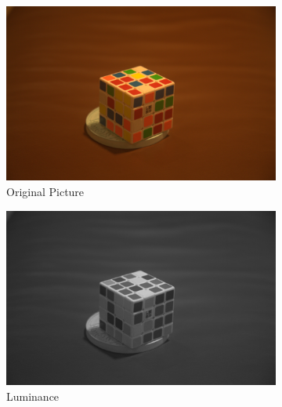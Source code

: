 \documentclass{article}
\begin{document}
\begin{figure}[h!]
\centering
\begin{subfigure}[b]{0.4\textwidth}
\caption{Original Picture}
\begin{center}
	\includegraphics[width=\textwidth]{./implementation/experiment/out.png}
\end{center}
\end{subfigure}
\begin{subfigure}[b]{0.4\textwidth}
\caption{Luminance}
\begin{center}
	\includegraphics[width=\textwidth]{./implementation/experiment/Y.png}
\end{center}
\end{subfigure}
\begin{subfigure}[b]{0.4\textwidth}
\begin{center}

\end{center}
\end{subfigure}
\end{figure}
\end{document}
